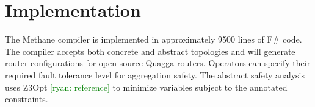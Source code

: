 \documentclass{sig-alternate-10pt}
\newcommand{\ryan}[1]{\textcolor{green}{[ryan: #1]}}
\newcommand{\sysname}{{\small \sf Methane}\xspace}
\newcommand{\para}[1]{\paragraph*{\textbf{#1}}}
\newcommand{\KW}[1]{\texttt{\small\bfseries{#1}}}
\begin{document}






%
%
%
%


\section{Implementation}
\label{sec:implementation}

The \sysname compiler is implemented in approximately 9500 lines of F\# code. The compiler accepts both concrete and abstract topologies and will generate router configurations for open-source Quagga routers. Operators can specify their required fault tolerance level for aggregation safety. The abstract safety analysis uses Z3Opt \ryan{reference} to minimize variables subject to the annotated constraints.
\end{document}
